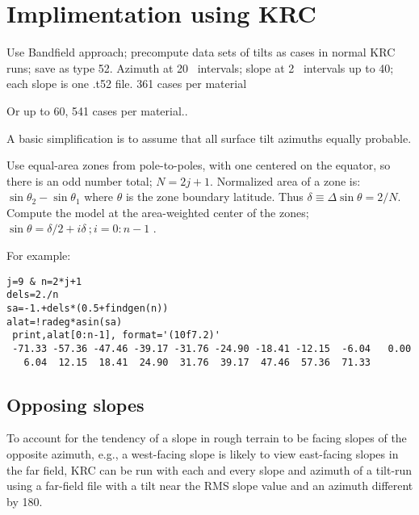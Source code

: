 \documentclass{article}
\begin{document}
\section{Implimentation using KRC}
Use Bandfield approach; precompute data sets of tilts as cases in
normal KRC runs; save as type 52. Azimuth at 20\qd~ intervals; slope at 2\qd~
intervals up to 40\qd; each slope is one .t52 file. 361 cases per material

Or up to 60\qd, 541 cases per material..

A basic simplification is to assume that all surface tilt azimuths equally probable.
 
Use equal-area zones from pole-to-poles, with one centered on the equator, so
there is an odd number total; $N=2j+1$.  Normalized area of a zone is: $\sin
\theta_2 - \sin \theta_1$ where $\theta$ is the zone boundary latitude. Thus
$\delta \equiv \Delta \sin \theta = 2/N $.  Compute the model at the
area-weighted center of the zones; $\sin \theta= \delta/2+i \delta \ ; i=0:n-1$ .

 For example:
\begin{verbatim}
j=9 & n=2*j+1
dels=2./n
sa=-1.+dels*(0.5+findgen(n))
alat=!radeg*asin(sa)
 print,alat[0:n-1], format='(10f7.2)'
 -71.33 -57.36 -47.46 -39.17 -31.76 -24.90 -18.41 -12.15  -6.04   0.00
   6.04  12.15  18.41  24.90  31.76  39.17  47.46  57.36  71.33  
\end{verbatim}
\subsection{Opposing slopes}
 To account for the tendency of a slope in rough terrain to be facing slopes of
 the opposite azimuth, e.g., a west-facing slope  is likely to view
 east-facing slopes in the far field, KRC can be run with each and every
 slope and azimuth of a tilt-run using a far-field file with a tilt near the RMS
 slope value and an azimuth different by 180\qd.
\end{document}
